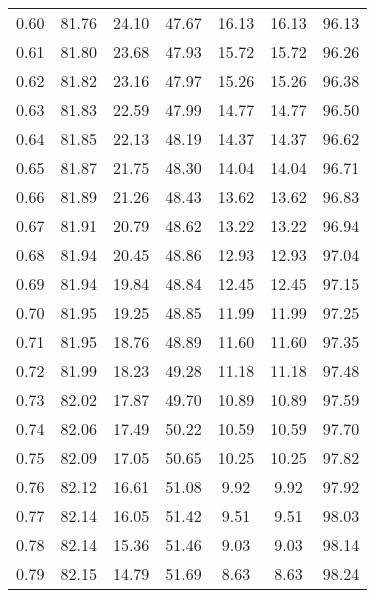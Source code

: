 \begin{tabular}{|c|c|c|c|c|c|c|}
      0.60 &     81.76 &     24.10 &      47.67 &   16.13 &      16.13 &         96.13 \\
      0.61 &     81.80 &     23.68 &      47.93 &   15.72 &      15.72 &         96.26 \\
      0.62 &     81.82 &     23.16 &      47.97 &   15.26 &      15.26 &         96.38 \\
      0.63 &     81.83 &     22.59 &      47.99 &   14.77 &      14.77 &         96.50 \\
      0.64 &     81.85 &     22.13 &      48.19 &   14.37 &      14.37 &         96.62 \\
      0.65 &     81.87 &     21.75 &      48.30 &   14.04 &      14.04 &         96.71 \\
      0.66 &     81.89 &     21.26 &      48.43 &   13.62 &      13.62 &         96.83 \\
      0.67 &     81.91 &     20.79 &      48.62 &   13.22 &      13.22 &         96.94 \\
      0.68 &     81.94 &     20.45 &      48.86 &   12.93 &      12.93 &         97.04 \\
      0.69 &     81.94 &     19.84 &      48.84 &   12.45 &      12.45 &         97.15 \\
      0.70 &     81.95 &     19.25 &      48.85 &   11.99 &      11.99 &         97.25 \\
      0.71 &     81.95 &     18.76 &      48.89 &   11.60 &      11.60 &         97.35 \\
      0.72 &     81.99 &     18.23 &      49.28 &   11.18 &      11.18 &         97.48 \\
      0.73 &     82.02 &     17.87 &      49.70 &   10.89 &      10.89 &         97.59 \\
      0.74 &     82.06 &     17.49 &      50.22 &   10.59 &      10.59 &         97.70 \\
      0.75 &     82.09 &     17.05 &      50.65 &   10.25 &      10.25 &         97.82 \\
      0.76 &     82.12 &     16.61 &      51.08 &    9.92 &       9.92 &         97.92 \\
      0.77 &     82.14 &     16.05 &      51.42 &    9.51 &       9.51 &         98.03 \\
      0.78 &     82.14 &     15.36 &      51.46 &    9.03 &       9.03 &         98.14 \\
      0.79 &     82.15 &     14.79 &      51.69 &    8.63 &       8.63 &         98.24 \\

\end{tabular}

